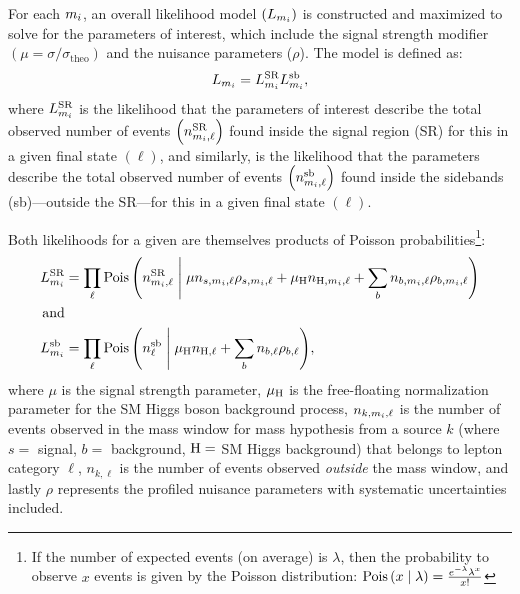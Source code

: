 For each $m_{i}$, an overall likelihood model $(L_{m_{i}})$ is constructed and maximized to solve for the parameters of interest, which include the signal strength modifier $\left( \mu = \sigma / \sigma_\text{theo} \right)$ and the nuisance parameters ($\rho$).
The model is defined as:
\begin{equation*}
    \lhoodm =
    \lhoodSR %
    \lhoodsb, %
\end{equation*}
where $L^\text{SR}_{m_{i}}$ is the likelihood that the parameters of interest describe the total observed number of events $\left( n^\text{SR}_{m_{i}, \ell} \right)$ found inside the signal region (SR) for this  in a given final state $(\ell)$,
and similarly, \lhoodsb is the likelihood that the parameters describe the total observed number of events $\left( n^\text{sb}_{m_{i}, \ell} \right)$ found inside the sidebands (sb)---\ie outside the SR---for this  in a given final state $(\ell)$.

Both likelihoods for a given  are themselves products of Poisson probabilities\footnote
{
    If the number of expected events (on average) is $\lambda$, then the probability to observe $x$ events is given by the Poisson distribution:
    $\text{Pois}\left( x \; \middle| \;{} \lambda \right) = \frac{e^{-\lambda} \lambda^x}{x!}$
}:
\begin{align*}
    \lhoodSR &= \prod_\ell{
        \poisson{
            n^\text{SR}_{\mass{i},\ell}
            \middlepipe
            \mu n_{s, \mass{i}, \ell} \rho_{s, \mass{i}, \ell} + \mu_\PH n_{\PH, \mass{i}, \ell} + 
            \sum_b{
                n_{b, \mass{i}, \ell} \rho_{b, \mass{i}, \ell}
                }
            }
    }
    \\
    \text{and} &
    \\
    \lhoodsb &= \prod_\ell{
        \poisson{
            n^\text{sb}_{\ell}
            \middlepipe
            \mu_\PH n_{\PH, \ell} + 
            \sum_b{
                n_{b, \ell} \rho_{b, \ell}
                }
            }
    },
\end{align*}
where $\mu$ is the signal strength parameter,
$\mu_\mathrm{H}$ is the free-floating normalization parameter for the SM Higgs boson background process,
$n_{k, m_{i}, \ell}$ is the number of events observed in the mass window for mass hypothesis  from a source $k$ (where $s=$ signal, $b=$ background, $\mathrm{H}=$ SM Higgs background) that belongs to lepton category $\ell$,
$n_{k, \ell}$ is the number of events observed \emph{outside} the mass window,
and lastly $\rho$ represents the profiled nuisance parameters with systematic uncertainties included.

